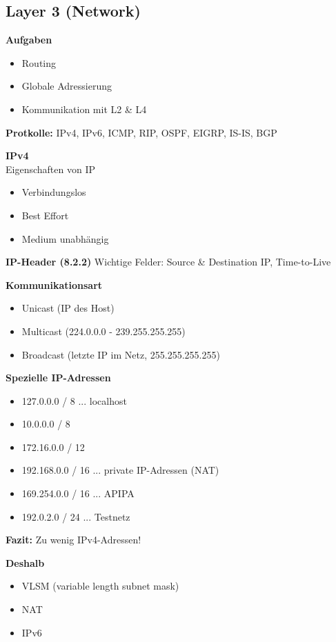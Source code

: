 \subsection{Layer 3 (Network)}
\textbf{Aufgaben}
\begin{itemize}
	\item Routing
	\item Globale Adressierung
	\item Kommunikation mit L2 \& L4
\end{itemize}

\textbf{Protkolle:} IPv4, IPv6, ICMP, RIP, OSPF, EIGRP, IS-IS, BGP

\textbf{IPv4} \\
Eigenschaften von IP
\begin{itemize}
	\item Verbindungslos
	\item Best Effort
	\item Medium unabhängig
\end{itemize}

\textbf{IP-Header (8.2.2)}
Wichtige Felder: Source \& Destination IP, Time-to-Live

\textbf{Kommunikationsart}
\begin{itemize}
	\item Unicast (IP des Host)
	\item Multicast (224.0.0.0 - 239.255.255.255)
	\item Broadcast (letzte IP im Netz, 255.255.255.255)
\end{itemize}

\textbf{Spezielle IP-Adressen} \\
\begin{itemize}
	\item 127.0.0.0 / 8 ... localhost
	\item 10.0.0.0 / 8
	\item[] 172.16.0.0 / 12
	\item[] 192.168.0.0 / 16 ... private IP-Adressen (NAT)
	\item 169.254.0.0 / 16 ... APIPA
	\item 192.0.2.0 / 24 ... Testnetz
\end{itemize}

\textbf{Fazit:} Zu wenig IPv4-Adressen!

\textbf{Deshalb}
\begin{itemize}
	\item VLSM (variable length subnet mask)
	\item NAT
	\item IPv6
\end{itemize} 

